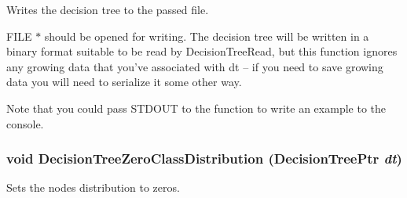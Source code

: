 Writes the decision tree to the passed file. 

FILE $\ast$ should be opened for writing. The decision tree will be written in a binary format suitable to be read by Decision\-Tree\-Read, but this function ignores any growing data that you've associated with dt -- if you need to save growing data you will need to serialize it some other way.

Note that you could pass STDOUT to the function to write an example to the console. 
\subsubsection{\setlength{\rightskip}{0pt plus 5cm}void Decision\-Tree\-Zero\-Class\-Distribution ({\bf Decision\-Tree\-Ptr} {\em dt})}\label{DecisionTree_8h_a18}


Sets the nodes distribution to zeros. 

